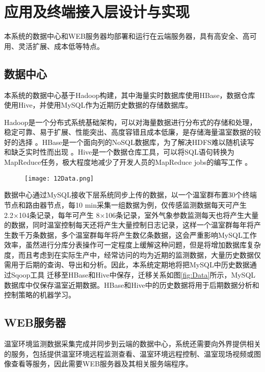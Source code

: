 \section{应用及终端接入层设计与实现}
	本系统的数据中心和WEB服务器均部署和运行在云端服务器，具有高安全、高可用、灵活扩展、成本低等特点。
	\subsection{数据中心}
本系统的数据中心基于Hadoop构建，其中海量实时数据库使用HBase，数据仓库使用Hive，并使用MySQL作为近期历史数据的存储数据库。

Hadoop是一个分布式系统基础架构，可以对海量数据进行分布式的存储和处理，稳定可靠、易于扩展、性能突出、高度容错且成本低廉，是存储海量温室数据的较好的选择\supercite{hadoop} 。HBase是一个面向列的NoSQL数据库，为了解决HDFS难以随机读写和缺乏实时性而出现\supercite{hbase} 。Hive是一个数据仓库工具，可以将SQL语句转换为MapReduce任务，极大程度地减少了开发人员的MapReduce jobs的编写工作\supercite{hive} 。

	\begin{figure}[!htbp]
		\centering
		\texttt{[image: 12Data.png]}
	\end{figure}
数据中心通过MySQL接收下层系统同步上传的数据，以一个温室群布置30个终端节点和路由器节点，每10 min采集一组数据为例，仅传感监测数据每天可产生2.2×104条记录，每年可产生 8×106条记录，室外气象参数监测每天也将产生大量的数据，同时温室控制每天还将产生大量控制日志记录，这样一个温室群每年将产生数千万条数据，多个温室群每年将产生数亿条数据，这会严重影响MySQL工作效率，虽然进行分库分表操作可一定程度上缓解这种问题，但是将增加数据库复杂度，而且考虑到在实际生产中，经常访问的均为近期的监测数据，大量历史数据仅需用于后期的查询、导出和分析。因此，本系统定期地将把MySQL中历史数据通过Sqoop工具\supercite{sqoop} 迁移至HBase和Hive中保存，迁移关系如图\ref{fig:Data}所示，MySQL数据库中仅保存温室近期数据。HBase和Hive中的历史数据将用于后期数据分析和控制策略的机器学习。
 
	\subsection{WEB服务器}
温室环境监测数据采集完成并同步到云端的数据中心，系统还需要向外界提供相关的服务，包括提供温室环境远程监测查看、温室环境远程控制、温室现场视频或图像查看等服务，因此需要WEB服务器及其相关服务端程序。


